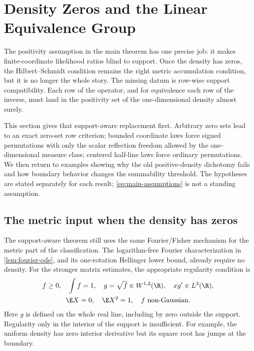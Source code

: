 \section{Density Zeros and the Linear Equivalence Group}
\label{sec:density-zeros-and-the-linear-equivalence-group}

The positivity assumption in the main theorem has one precise job: it makes
finite-coordinate likelihood ratios blind to support.
Once the density has zeros, the Hilbert--Schmidt condition remains the right
metric accumulation condition, but it is no longer the whole story.
The missing datum is row-wise support compatibility.
Each row of the operator, and for equivalence each row of the inverse, must
land in the positivity set of the one-dimensional density almost surely.

This section gives that support-aware replacement first.
Arbitrary zero sets lead to an exact zero-set row criterion; bounded
coordinate laws force signed permutations with only the scalar reflection
freedom allowed by the one-dimensional measure class; centered half-line laws
force ordinary permutations.
We then return to examples showing why the old positive-density dichotomy
fails and how boundary behavior changes the summability threshold.
The hypotheses are stated separately for each result;
\eqref{eq:main-assumptions} is not a standing assumption.

\subsection{The metric input when the density has zeros}
\label{sec:restricted-local}

The support-aware theorem still uses the same Fourier/Fisher mechanism for
the metric part of the classification.
The logarithm-free Fourier characterization in \cref{lem:fourier-ode}, and
its one-rotation Hellinger lower bound, already require no density.
For the stronger matrix estimates, the appropriate regularity condition is
\begin{equation}
 \begin{gathered}
 f\geq0,\quad \int f=1,\quad
 g=\sqrt f\in W^{1,2}(\R),\quad xg'\in L^2(\R),\\
 \E X=0,\quad \E X^2=1,\quad f\text{ non-Gaussian}.
 \end{gathered}
 \label{eq:restricted-sobolev}
\end{equation}
Here \(g\) is defined on the whole real line, including by zero outside
the support.
Regularity only in the interior of the support is insufficient.
For example, the uniform density has zero interior derivative but its
square root has jumps at the boundary.

